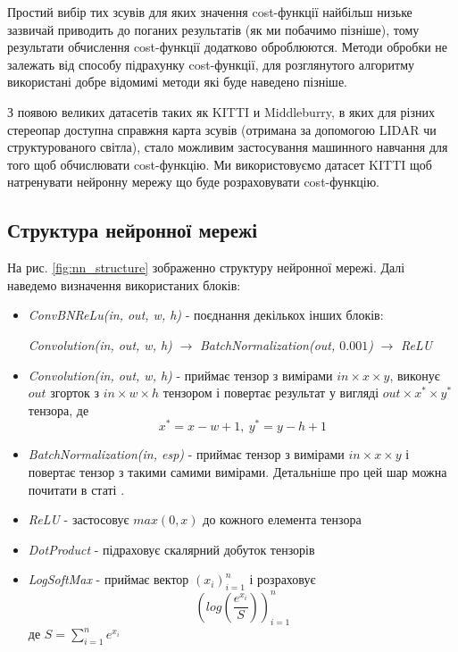 \documentclass[11pt]{article}
\theoremstyle{definition}
\begin{document}
Простий вибір тих зсувів для яких значення cost-функції найбільш низьке зазвичай приводить до поганих результатів (як ми побачимо пізніше), тому результати обчислення cost-функції додатково оброблюются. Методи обробки не залежать від способу підрахунку cost-функції, для розглянутого алгоритму використані добре відомимі методи які буде наведено пізніше.

З появою великих датасетів таких як KITTI и Middleburry, в яких для різних стереопар доступна справжня карта зсувів (отримана за допомогою LIDAR чи структурованого світла), стало можливим застосування машинного навчання для того щоб обчислювати cost-функцію. Ми використовуємо датасет KITTI щоб натренувати нейронну мережу що буде розраховувати cost-функцію.

\subsection{Структура нейронної мережі}
На рис. \ref{fig:nn_structure} зображенно структуру нейронної мережі. Далі наведемо визначення використаних блоків:
\begin{itemize}
	\item \textit{ConvBNReLu(in, out, w, h)} - поєднання декількох інших блоків: 
	
	\textit{Convolution(in, out, w, h)} $\to$ \textit{BatchNormalization(out, $0.001$)} $\to$ \textit{ReLU}
	
	\item \textit{Convolution(in, out, w, h)} - приймає тензор з вимірами $in \times x \times y$, виконує $out$ згорток з $in \times w \times h$ тензором і повертає результат у вигляді $out \times x^* \times y^*$ тензора, де 
	\[ x^* = x - w + 1, \  y^* = y - h + 1 \]
	
	\item \textit{BatchNormalization(in, esp)} - приймає тензор з вимірами $in \times x \times y$ і повертає тензор з такими самими вимірами. Детальніше про цей шар можна почитати в статі \cite{ioffe2015batch}.
	
	\item \textit{ReLU} - застосовує $max(0, x)$ до кожного елемента тензора
	
	\item \textit{DotProduct} - підраховує скалярний добуток тензорів
	
	\item \textit{LogSoftMax} - приймає вектор $(x_i)_{i=1}^n$ і розраховує 
	\[ \left( log\left( \frac{e^{x_i}}{S} \right) \right)_{i=1}^n \]
	де $S = \sum_{i=1}^n e^{x_i}$
\end{itemize}
\end{document}
